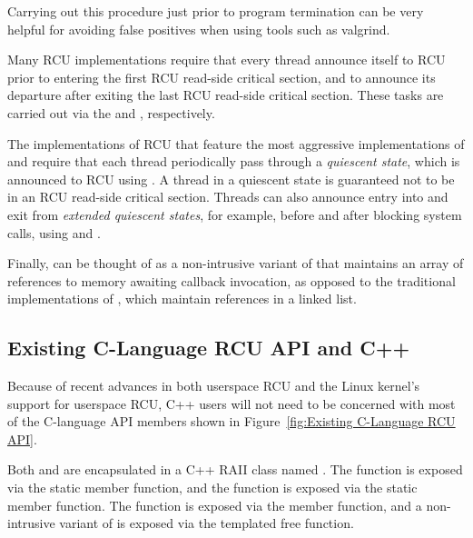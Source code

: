\documentclass[letterpaper,10pt]{article}
\begin{document}
Carrying out this procedure just prior to program termination can be very
helpful for avoiding false positives when using tools such as valgrind.

Many RCU implementations require that every thread announce itself to
RCU prior to entering the first RCU read-side critical section, and
to announce its departure after exiting the last RCU read-side
critical section.
These tasks are carried out via the  and
, respectively.

The implementations of RCU that feature the most aggressive implementations of
 and  require that each thread
periodically pass through a \emph{quiescent state}, which is announced to RCU
using .
A thread in a quiescent state is guaranteed not to be in an RCU
read-side critical section.
Threads can also announce entry into and exit from \emph{extended
quiescent states}, for example, before and after blocking system
calls, using  and .

Finally,  can be thought of as a non-intrusive
variant of  that maintains an array of references
to memory awaiting callback invocation, as opposed to the traditional
implementations of , which maintain references in a
linked list.

\subsection{Existing C-Language RCU API and C++}
\label{sec:Existing C-Language RCU API and C++}

Because of recent advances in both userspace RCU and the Linux kernel's
support for userspace RCU, C++ users will not need to be concerned
with most of the C-language API members shown in
Figure~\ref{fig:Existing C-Language RCU API}.

Both  and  are encapsulated
in a C++ RAII class named .
The  function is exposed via the
 static member function, and
the  function is exposed via the
 static member function.
The  function is exposed via the
 member function,
and a non-intrusive variant of  is exposed via the
 templated free function.
\end{document}
